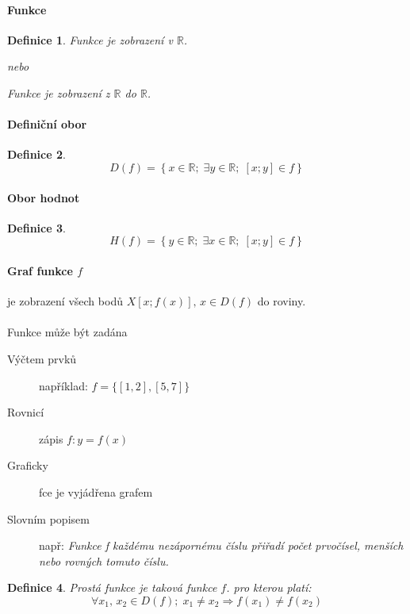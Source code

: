\documentclass[12pt,a4wide,oneside,
headings]{report}
\newtheorem{defi}{Definice}[chapter]\theoremstyle{definition}
\begin{document}
\paragraph{Funkce}
\begin{defi}
Funkce je zobrazení v $\mathbb{R}$.

\textit{nebo}

Funkce je zobrazení z $\mathbb{R}$ do $\mathbb{R}$.

\end{defi}

\paragraph{Definiční obor}
\begin{defi}
$$D(f)=\left\lbrace x\in \mathbb{R};\;\exists y\in \mathbb{R};\;\left[x;y\right]\in f  \right\rbrace$$
\end{defi}\paragraph{Obor hodnot}
\begin{defi}
$$H(f)=\left\lbrace y\in \mathbb{R};\;\exists x\in \mathbb{R};\;\left[x;y\right]\in f  \right\rbrace$$
\end{defi}


\paragraph{Graf funkce $f$} je zobrazení všech bodů $X\left[x;f(x)\right],\, x\in D(f)$ do roviny.

\paragraph{} Funkce může být zadána
\begin{description}
\item[Výčtem prvků] například: $f=\lbrace [1,2],[5,7] \rbrace$
\item[Rovnicí] zápis $f:y=f(x)$
\item[Graficky] fce je vyjádřena grafem
\item[Slovním popisem] např: \emph{Funkce f každému nezápornému číslu přiřadí počet prvočísel, menších nebo rovných
tomuto číslu.}
\end{description}

\begin{defi}
Prostá funkce je taková funkce $f$. pro kterou platí:
$$ \forall x_1,\,x_2 \in D(f);\; x_1\neq x_2 \Rightarrow f(x_1)\neq f(x_2)$$

\end{defi}
\end{document}
